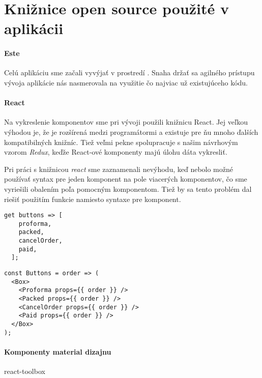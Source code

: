 \section{Knižnice open source použité v aplikácii}%

\paragraph{Este}
Celú aplikáciu sme začali vyvýjať v prostredí \cite[este]{Este}. Snaha držať sa agilného prístupu vývoja aplikácie nás nasmerovala na využitie čo najviac už existujúceho kódu. %
\TODO{}

\paragraph{React}
Na vykreslenie komponentov sme pri vývoji použili knižnicu React. Jej veľkou výhodou je, že je rozšírená medzi programátormi a existuje pre ňu mnoho ďalších kompatibilných knižníc. Tiež veľmi pekne spolupracuje s našim návrhovým vzorom \emph{Redux}, keďže React-ové komponenty majú úlohu dáta vykresliť.

Pri práci s knižnicou \emph{react} sme zaznamenali nevýhodu, keď nebolo možné používať syntax pre jeden komponent na pole viacerých komponentov, čo sme vyriešili obalením poľa pomocným komponentom. Tiež by sa tento problém dal riešiť použitím funkcie namiesto syntaxe pre komponent.

\TODO{}

\begin{lstlisting}[caption=Pole komponentov v Dart-e]
  get buttons => [
    proforma,
    packed,
    cancelOrder,
    paid,
  ];
\end{lstlisting}

\begin{lstlisting}[caption=Pole komponentov v JavaScripte s použitím knižnice React]
const Buttons = order => (
  <Box>
    <Proforma props={{ order }} />
    <Packed props={{ order }} />
    <CancelOrder props={{ order }} />
    <Paid props={{ order }} />
  </Box>
);
\end{lstlisting}


\paragraph{Komponenty material dizajnu}
\TODO{}

react-toolbox


